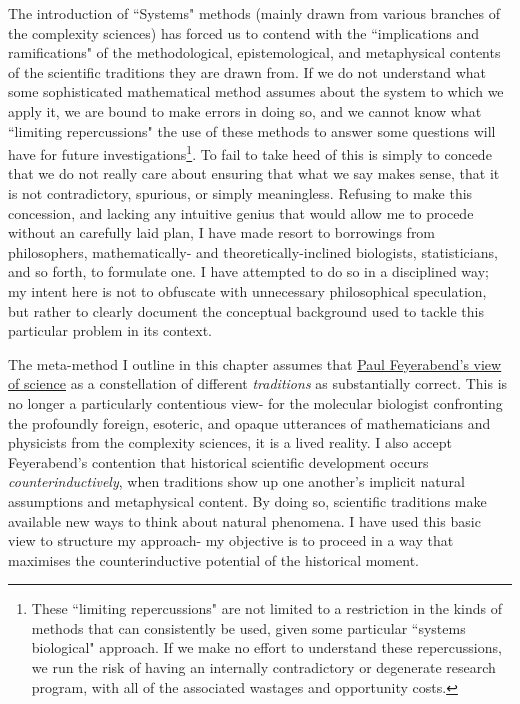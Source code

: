 The introduction of ``Systems" methods (mainly drawn from various branches of the complexity sciences) has forced us to contend with the ``implications and ramifications" of the methodological, epistemological, and metaphysical contents of the scientific traditions they are drawn from. If we do not understand what some sophisticated mathematical method assumes about the system to which we apply it, we are bound to make errors in doing so, and we cannot know what ``limiting repercussions" the use of these methods to answer some questions will have for future investigations\footnote{These ``limiting repercussions" are not limited to a restriction in the kinds of methods that can consistently be used, given some particular ``systems biological" approach. If we make no effort to understand these repercussions, we run the risk of having an internally contradictory or degenerate research program, with all of the associated wastages and opportunity costs.}. To fail to take heed of this is simply to concede that we do not really care about ensuring that what we say makes sense, that it is not contradictory, spurious, or simply meaningless. Refusing to make this concession, and lacking any intuitive genius that would allow me to procede without an carefully laid plan, I have made resort to borrowings from philosophers, mathematically- and theoretically-inclined biologists, statisticians, and so forth, to formulate one. I have attempted to do so in a disciplined way; my intent here is not to obfuscate with unnecessary philosophical speculation, but rather to clearly document the conceptual background used to tackle this particular problem in its context.

The meta-method I outline in this chapter assumes that \hyperref[traditions]{Paul Feyerabend's view of science} as a constellation of different \textit{traditions} as substantially correct. This is no longer a particularly contentious view- for the molecular biologist confronting the profoundly foreign, esoteric, and opaque utterances of mathematicians and physicists from the complexity sciences, it is a lived reality. I also accept Feyerabend's contention that historical scientific development occurs \textit{counterinductively}, when traditions show up one another's implicit natural assumptions and metaphysical content. By doing so, scientific traditions make available new ways to think about natural phenomena. I have used this basic view to structure my approach- my objective is to proceed in a way that maximises the counterinductive potential of the historical moment.


